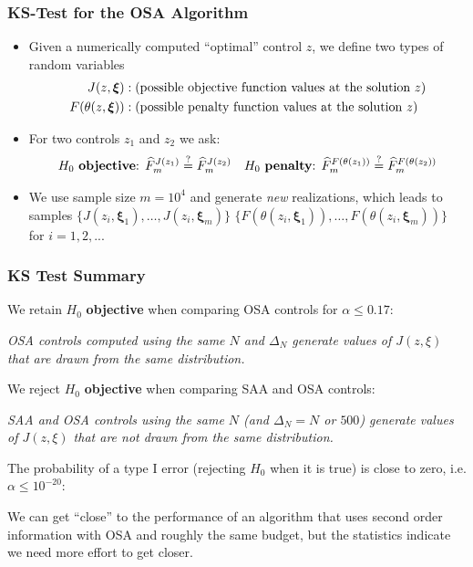 \documentclass[aspectratio=169,xcolor=dvipsnames,11pt]{beamer}
\newcommand{\xibold}{\mathbold{\xi}}
\begin{document}
\begin{footnotesize}
\begin{frame}\frametitle{KS-Test for the OSA Algorithm}
\begin{block}{}
\begin{itemize}
\item Given a numerically computed ``optimal'' control $z$, we define two types of random variables
\[
\aligned
J(z,\xibold) &: \text{(possible objective function values at the solution $z$)}\\
F(\theta(z,\xibold)) &: \text{(possible penalty function values at the solution $z$)}\\
\endaligned
\]
\item For two controls $z_1$ and $z_2$ we ask: 
\[
\aligned
&\text{$H_0$ \textbf{objective}: $\widehat{F}^{J(z_1)}_m \stackrel{?}{=}  \widehat{F}^{J(z_2)}_m$}\quad \text{$H_0$ \textbf{penalty}:  $\widehat{F}^{F(\theta(z_1))}_m \stackrel{?}{=}  \widehat{F}^{F(\theta(z_2))}_m$}\\
\endaligned
\]
\item We use sample size $m = 10^4$ and generate \textit{new} realizations, which leads to samples
$\{ J(z_i,\xibold_1), \dots, J(z_i,\xibold_m)\}$
$\{ F(\theta(z_i,\xibold_1)), \dots, F(\theta(z_i,\xibold_m))\}$ for $i = 1,2,...$
\end{itemize}
\end{block}
\end{frame}

\begin{frame}\frametitle{KS Test Summary}
\begin{block}{}
\begin{itemize}
\item We {\color{Blue}retain} $H_0$ \textbf{objective} when comparing OSA controls for $\alpha \le 0.17$:
\begin{center}
\textit{
OSA controls computed using the same $N$ and $\Delta_N$ generate values of $J(z,\xi)$ that are drawn from the same distribution.
}
\end{center}\pause
\item We {\color{Red}reject} $H_0$ \textbf{objective} when comparing SAA and OSA controls:
\begin{center}
\textit{
SAA and OSA controls using the same $N$ (and $\Delta_N = N$ or $500$) generate values of $J(z,\xi)$ that are not drawn from the same distribution.
}
\item The probability of a type I error (rejecting $H_0$ when it is true) is close to zero, i.e. $\alpha \le 10^{-20}$:
\end{center}%
\end{itemize}
\end{block}\pause
\begin{block}{}
\centering We can get ``close'' to the performance of an algorithm that uses second order information with OSA and roughly the same budget, but the statistics indicate we need more effort to get closer.
\end{block}
\end{frame}


\end{footnotesize}
\end{document}
